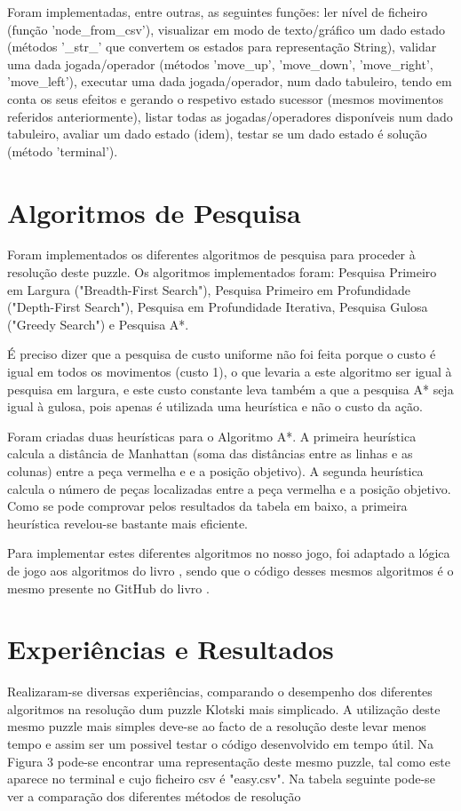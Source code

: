 \documentclass[conference]{IEEEtran}
\begin{document}
Foram implementadas, entre outras, as seguintes funções: ler nível de ficheiro
(função 'node\_from\_csv'), visualizar em modo de texto/gráfico um dado estado (métodos '\_str\_' que convertem os estados para representação String), validar uma dada jogada/operador (métodos 'move\_up', 'move\_down', 'move\_right', 'move\_left'), executar uma dada jogada/operador, num dado tabuleiro, tendo em conta os seus efeitos e gerando o respetivo estado sucessor (mesmos movimentos referidos anteriormente), listar todas as jogadas/operadores disponíveis num dado tabuleiro, avaliar um dado estado (idem), testar se um dado estado é solução (método 'terminal').


\section{Algoritmos de Pesquisa}
Foram implementados os diferentes algoritmos de pesquisa para proceder à resolução deste puzzle. Os algoritmos implementados foram: Pesquisa Primeiro em Largura ("Breadth-First Search"), Pesquisa Primeiro em Profundidade ("Depth-First Search"), Pesquisa em Profundidade Iterativa, Pesquisa Gulosa ("Greedy Search") e Pesquisa A*. 

É preciso dizer que a pesquisa de custo uniforme não foi feita porque o custo é igual em todos os movimentos (custo 1), o que levaria a este algoritmo ser igual à pesquisa em largura, e este custo constante leva também a que a pesquisa A* seja igual à gulosa, pois apenas é utilizada uma heurística e não o custo da ação.

Foram criadas duas heurísticas para o Algoritmo A*. A primeira heurística calcula a distância de Manhattan (soma das distâncias entre as linhas e as colunas) entre a peça vermelha e  e a posição objetivo). A segunda heurística calcula o número de peças localizadas entre a peça vermelha e a posição objetivo. Como se pode comprovar pelos resultados da tabela em baixo, a primeira heurística revelou-se bastante mais eficiente.

Para implementar estes diferentes algoritmos no nosso jogo, foi adaptado a lógica de jogo aos algoritmos do livro \cite{b8}, sendo que o código desses mesmos algoritmos é o mesmo presente no GitHub do livro \cite{b9}.


\section{Experiências e Resultados}
Realizaram-se diversas experiências, comparando o desempenho dos diferentes algoritmos na resolução dum puzzle Klotski mais simplicado. A utilização deste mesmo puzzle mais simples deve-se ao facto de a resolução deste levar menos tempo e assim ser um possivel testar o código desenvolvido em tempo útil. Na Figura 3 pode-se encontrar uma representação deste mesmo puzzle, tal como este aparece no terminal e cujo ficheiro csv é "easy.csv". Na tabela seguinte pode-se ver a comparação dos diferentes métodos de resolução
\end{document}
